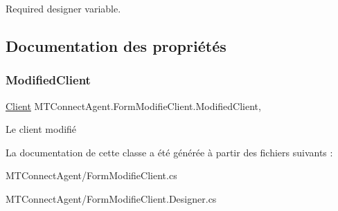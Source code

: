 Required designer variable. 



\subsection{Documentation des propriétés}
\mbox{\label{class_m_t_connect_agent_1_1_form_modifie_client_a8f2c248d245052d915c92a991ce11e75}} 
\subsubsection{\texorpdfstring{Modified\+Client}{ModifiedClient}}
{\footnotesize\ttfamily \mbox{\hyperlink{class_m_t_connect_agent_1_1_model_1_1_client}{Client}} M\+T\+Connect\+Agent.\+Form\+Modifie\+Client.\+Modified\+Client\hspace{0.3cm}{\ttfamily [get]}, {\ttfamily [set]}}



Le client modifié 



La documentation de cette classe a été générée à partir des fichiers suivants \+:\begin{DoxyCompactItemize}
\item 
M\+T\+Connect\+Agent/Form\+Modifie\+Client.\+cs\item 
M\+T\+Connect\+Agent/Form\+Modifie\+Client.\+Designer.\+cs\end{DoxyCompactItemize}

